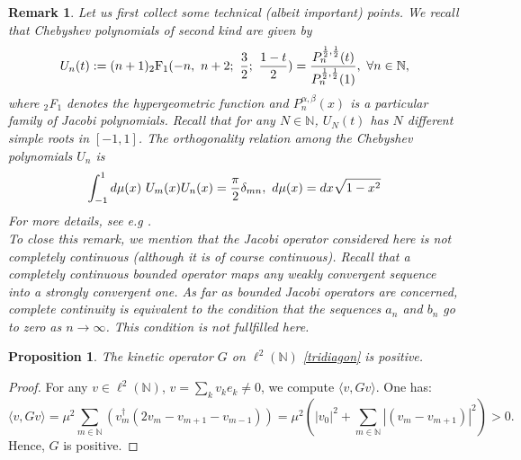 \documentclass[a4paper,11pt,twoside]{article}
\numberwithin{equation}{section}
\newtheorem{proposition}[Theorem]{Proposition}
\newtheorem{remark}[Theorem]{Remark}
\theoremstyle{nonumberplain}
\newtheorem{proof}{Proof}
\begin{document}
\begin{remark}
Let us first collect some technical (albeit important) points. We recall that Chebyshev polynomials of second kind are given by
\begin{equation}
U_n(t):=(n+1){\mbox{$_2$F$_1$}(-n,\ n+2;\ {{3}\over{2}};\ {{1-t}\over{2}})}={{P_n^{{{1}\over{2}},{{1}\over{2}}}(t) }\over{P_n^{{{1}\over{2}},{{1}\over{2}}}(1) }}, \ \forall n\in\mathbb{N}\label{defcheb},
\end{equation}
where $_2$F$_1$ denotes the hypergeometric function and $P_n^{\alpha,\beta}(x)$ is a particular family of Jacobi polynomials. Recall that for any $N\in\mathbb{N}$, $U_N(t)$ has $N$ different simple roots in $[-1,1]$. The orthogonality relation among the Chebyshev polynomials $U_n$ is
\begin{equation}
\int_{-1}^1d\mu(x)\ U_m(x)U_n(x)={{\pi}\over{2}}\delta_{mn},\ d\mu(x)=dx{\sqrt{1-x^2}}\label{orthocontinucheb2}
\end{equation}
For more details, see e.g \cite{kks}. \\
To close this remark, we mention that the Jacobi operator considered here is not completely continuous (although it is of course continuous). Recall that a completely continuous bounded operator maps any weakly convergent sequence into a strongly convergent one. As far as bounded Jacobi operators are concerned, complete continuity is equivalent to the condition that the sequences $a_n$ and $b_n$ go to zero as $n\to\infty$. This condition is not fullfilled here.
\end{remark}
\begin{proposition}\label{g-positive}
The kinetic operator $G$ on $\ell^2(\mathbb{N})$ \eqref{tridiagon} is positive.
\end{proposition}
\begin{proof}
For any $v\in\ell^2(\mathbb{N})$, $v=\sum_kv_ke_k\ne0$, we compute $\langle v,Gv\rangle$. One has:
\begin{equation}
\langle v,Gv\rangle=\mu^2\sum_{m\in\mathbb{N}}(v_m^\dag(2v_m-v_{m+1}-v_{m-1}))=\mu^2\left(|v_0|^2+\sum_{m\in\mathbb{N}}|(v_m-v_{m+1})|^2\right)>0.
\end{equation}
Hence, $G$ is positive.
\end{proof}
\end{document}

